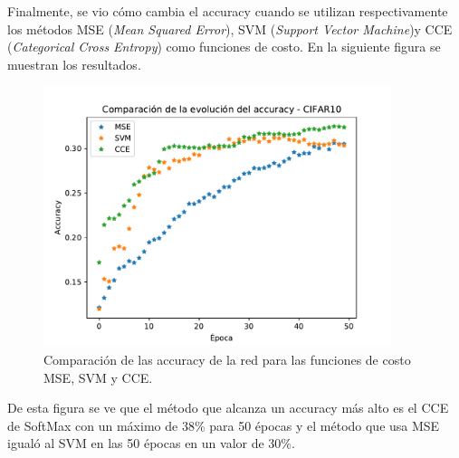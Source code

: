 Finalmente, se vio cómo cambia el accuracy cuando se utilizan respectivamente los métodos MSE (\textit{Mean Squared Error}), SVM (\textit{Support Vector Machine})y CCE (\textit{Categorical Cross Entropy}) como funciones de costo. En la siguiente figura se muestran los resultados.

\begin{figure}[H]
    \centering
    \includegraphics[height=3in]{image/EJ3comparacion2.pdf}
    \caption{Comparación de las accuracy de la red para las funciones de costo MSE, SVM y CCE.}
    \label{fig:ej3}
\end{figure}

De esta figura se ve que el método que alcanza un accuracy más alto es el CCE de SoftMax con un máximo de 38\% para 50 épocas y el método que usa MSE igualó al SVM en las 50 épocas en un valor de 30\%.

